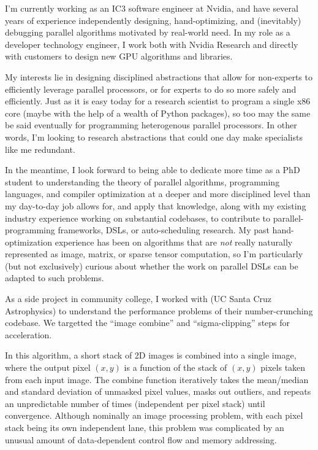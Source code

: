 


\raggedright
\reversemarginpar

I'm currently working as an IC3 software engineer at Nvidia, and have
several years of experience independently designing, hand-optimizing,
and (inevitably) debugging parallel algorithms motivated by real-world
need. In my role as a developer technology engineer, I work both with
Nvidia Research and directly with customers to design new GPU
algorithms and libraries.

My interests lie in designing disciplined abstractions that allow for
non-experts to efficiently leverage parallel processors, or for
experts to do so more safely and efficiently. Just as it is easy today
for a research scientist to program a single x86 core (maybe with the
help of a wealth of Python packages), so too may the same be said
eventually for programming heterogenous parallel processors. In other
words, I'm looking to research abstractions that could one day make
specialists like me redundant.

In the meantime, I look forward to being able to dedicate more time as
a PhD student to understanding the theory of parallel algorithms,
programming languages, and compiler optimization at a deeper and more
disciplined level than my day-to-day job allows for, and apply that
knowledge, along with my existing industry experience working on
substantial codebases, to contribute to parallel-programming
frameworks, DSLs, or auto-scheduling research. My past
hand-optimization experience has been on algorithms that
are \textit{not} really naturally represented as image, matrix, or
sparse tensor computation, so I'm particularly (but not exclusively)
curious about whether the work on parallel DSLs can be adapted to such
problems.

As a side project in community college, I worked
with  (UC Santa Cruz Astrophysics) to understand the performance
problems of their number-crunching codebase. We targetted the ``image
combine'' and ``sigma-clipping'' steps for acceleration.

In this algorithm, a short stack of 2D images is combined into a
single image, where the output pixel $(x,y)$ is a function of the
stack of $(x,y)$ pixels taken from each input image.  The combine
function iteratively takes the mean/median and standard deviation of
unmasked pixel values, masks out outliers, and repeats an
unpredictable number of times (independent per pixel stack) until
convergence. Although nominally an image processing problem, with each
pixel stack being its own independent lane, this problem was
complicated by an unusual amount of data-dependent control flow and
memory addressing.

